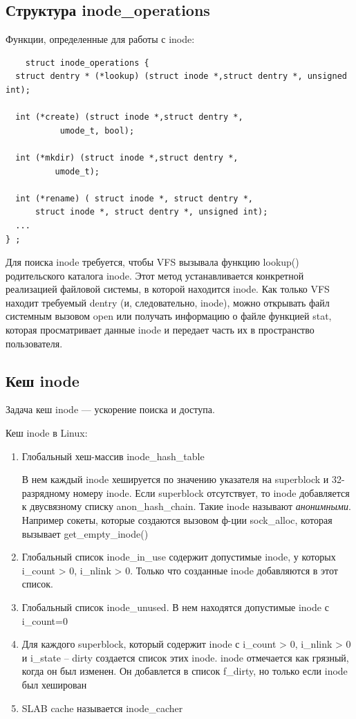 \subsection{Структура inode\_operations}
Функции, определенные для работы с inode:
\begin{lstlisting}
    struct inode_operations {
  struct dentry * (*lookup) (struct inode *,struct dentry *, unsigned int);
  
  int (*create) (struct inode *,struct dentry *,
           umode_t, bool);

  int (*mkdir) (struct inode *,struct dentry *,
          umode_t);
  
  int (*rename) ( struct inode *, struct dentry *,
      struct inode *, struct dentry *, unsigned int);
  ...
} ;
\end{lstlisting}

Для поиска inode требуется, чтобы VFS вызывала функцию lookup() родительского каталога inode. Этот метод устанавливается конкретной реализацией файловой системы, в которой находится inode. Как только VFS находит требуемый dentry (и, следовательно, inode), можно открывать файл системным вызовом open или получать информацию о файле функцией stat, которая просматривает данные inode и передает часть их в пространство пользователя.


\subsection{Кеш inode}
Задача кеш inode --- ускорение поиска и доступа.

Кеш inode в Linux:
\begin{enumerate}
    \item Глобальный хеш-массив inode\_hash\_table

    В нем каждый inode хешируется по значению указателя на superblock и 32-разрядному номеру inode. Если superblock отсутствует, то inode добавляется к двусвязному списку anon\_hash\_chain. Такие inode называют \textit{анонимными}. Например сокеты, которые создаются вызовом ф-ции sock\_alloc, которая вызывает get\_empty\_inode()

    \item Глобальный список inode\_in\_use содержит допустимые inode, у которых i\_count > 0, i\_nlink > 0.
    Только что созданные inode добавляются в этот список.

    \item Глобальный список inode\_unused. В нем находятся допустимые inode с i\_count=0

    \item Для каждого superblock, который содержит inode с i\_count > 0, i\_nlink > 0 и i\_state -- dirty создается список этих inode. inode отмечается как грязный, когда он был изменен. Он добавлется в список f\_dirty, но только если inode был хеширован

    \item SLAB cache называется inode\_cacher
    
\end{enumerate}


